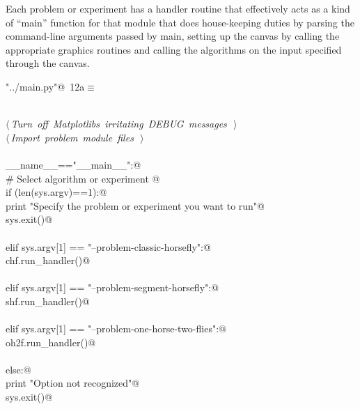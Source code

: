 \documentclass[11.5pt]{report}
\begin{document}
Each problem or experiment has a handler routine 
that effectively acts as a kind of ``main'' function for that module that 
does house-keeping duties by parsing the command-line arguments passed by main, 
setting up the canvas by calling the appropriate graphics routines and calling 
the algorithms on the input specified through the canvas. 

\begin{flushleft} \small
\begin{minipage}{\linewidth}\label{scrap1}\raggedright\small
{} \verb@"../main.py"@\nobreak\ {\footnotesize {12a}}$\equiv$
\vspace{-1ex}
\begin{list}{}{} \item
\mbox{}\verb@@\\
\mbox{}\verb@@\hbox{$\langle\,${\itshape Turn off Matplotlibs irritating DEBUG messages}\nobreak\ {\footnotesize {}}$\,\rangle$}\verb@@\\
\mbox{}\verb@@\hbox{$\langle\,${\itshape Import problem module files}\nobreak\ {\footnotesize {}}$\,\rangle$}\verb@@\\
\mbox{}\verb@@\\
\mbox{}\verb@if __name__=="__main__":@\\
\mbox{}\verb@     # Select algorithm or experiment @\\
\mbox{}\verb@     if (len(sys.argv)==1):@\\
\mbox{}\verb@          print "Specify the problem or experiment you want to run"@\\
\mbox{}\verb@          sys.exit()@\\
\mbox{}\verb@@\\
\mbox{}\verb@     elif sys.argv[1] == "--problem-classic-horsefly":@\\
\mbox{}\verb@          chf.run_handler()@\\
\mbox{}\verb@@\\
\mbox{}\verb@     elif sys.argv[1] == "--problem-segment-horsefly":@\\
\mbox{}\verb@          shf.run_handler()@\\
\mbox{}\verb@@\\
\mbox{}\verb@     elif sys.argv[1] == "--problem-one-horse-two-flies":@\\
\mbox{}\verb@          oh2f.run_handler()@\\
\mbox{}\verb@@\\
\mbox{}\verb@     else:@\\
\mbox{}\verb@          print "Option not recognized"@\\
\mbox{}\verb@          sys.exit()@\\
\mbox{}\verb@@{\NWsep}
\end{list}
\vspace{-1.5ex}
\footnotesize
\begin{list}{}{\setlength{\itemsep}{-\parsep}\setlength{\itemindent}{-\leftmargin}}

\item{}
\end{list}
\end{minipage}\vspace{4ex}
\end{flushleft}
\end{document}
